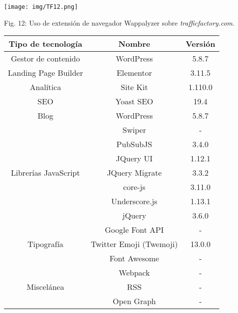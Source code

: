 \documentclass[12pt,oneside,a4paper]{book}
\begin{document}
\vspace{2em}

\begin{center}
	\texttt{[image: img/TF12.png]}
    
\vspace{0.1em}
    
    Fig. 12: Uso de extensión de navegador Wappalyzer sobre \textit{trafficfactory.com}.
\end{center}

\vspace{1em}

\begin{table}[H]
    \centering
    \begin{tabular}{|c|c|c|}
        \hline
        \textbf{Tipo de tecnología} & \textbf{Nombre} & \textbf{Versión}\\
        \hline
        Gestor de contenido & WordPress & 5.8.7 \\
        \hline
        Landing Page Builder & Elementor & 3.11.5 \\
        \hline
        Analítica & Site Kit & 1.110.0 \\
        \hline
        SEO & Yoast SEO & 19.4 \\
         \hline
        Blog & WordPress & 5.8.7 \\
        \hline
        \multirow{7}{*}{Librerías JavaScript} & Swiper & - \\
        \cline{2-3}
        & PubSubJS & 3.4.0 \\
        \cline{2-3}
        & JQuery UI & 1.12.1 \\
        \cline{2-3}
        & JQuery Migrate & 3.3.2 \\
        \cline{2-3}
        & core-js & 3.11.0 \\
        \cline{2-3}
        & Underscore.js & 1.13.1 \\
        \cline{2-3}
        & jQuery & 3.6.0 \\
        \hline
        \multirow{3}{*}{Tipografía} & Google Font API & - \\
        \cline{2-3}
        & Twitter Emoji (Twemoji) & 13.0.0 \\
        \cline{2-3}
        & Font Awesome & - \\
        \hline
        \multirow{5}{*}{Miscelánea} & Webpack & - \\
        \cline{2-3}
        & RSS & - \\
        \cline{2-3}
        & Open Graph & - \\

\end{tabular}
\end{table}
\end{document}
